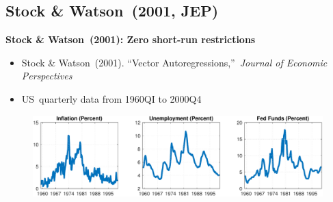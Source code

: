 
\subsection{Stock \& Watson\ (2001, JEP)}

\begin{frame}
\vspace{3cm} \color{title}%
\bigskip

\color{note}
\end{frame}


\begin{frame}
{\textbf{Stock \& Watson\ (2001): Zero short-run restrictions}}\bigskip

\begin{itemize}
\item Stock \& Watson\ (2001). \textquotedblleft Vector
Autoregressions,\textquotedblright\ \textit{Journal of Economic Perspectives}%
\bigskip

\item US\ quarterly data from 1960QI to 2000Q4
\end{itemize}

\begin{figure}[h]
\centering\includegraphics[width=.85\textwidth]{SW_DATA.pdf}
\end{figure}
\end{frame}


